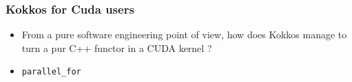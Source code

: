 \begin{frame}
  \frametitle{Kokkos for Cuda users}

  \begin{itemize}
  \item From a pure software engineering point of view, how does Kokkos manage to turn a pur C++ functor in a CUDA kernel ?
  \item \texttt{parallel\_for} 
  \end{itemize}

\end{frame}
